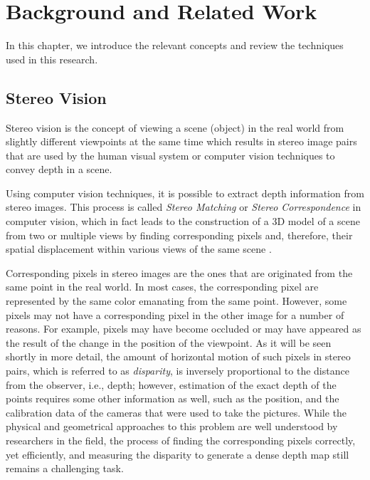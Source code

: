 \chapter{Background and Related Work}
\label{chap:Background}

In this chapter, we introduce the relevant concepts and review the techniques used in this research.

\section{Stereo Vision}

Stereo vision is the concept of viewing a scene (object) in the real world from slightly different
viewpoints at the same time which results in stereo image pairs that are used by the human visual system or computer vision techniques to convey
depth in a scene. 

Using computer vision techniques, it is possible to extract depth information from stereo
images. This process is called {\it Stereo Matching} or {\it Stereo Correspondence} in computer vision,
which in fact leads to the construction of a
3D model of a scene from two or multiple views by finding corresponding pixels and, therefore, their spatial displacement within various views of the same scene \cite{sze11}.

Corresponding pixels in stereo images are the ones that are originated from the same point in the real
world. In most cases, the corresponding pixel are represented by the same color emanating from the same point. However, some pixels may not have a corresponding 
pixel in the other image for a number of reasons. For example, pixels may have become occluded or may have appeared as the result of the change in the position
of the viewpoint. 
As it will be seen shortly in more detail, the amount of horizontal motion of such pixels
in stereo pairs, which is referred to as {\it disparity}, is inversely proportional to the
distance from the observer, i.e., depth; however,  estimation of the exact depth of the points requires some
other information as well, such as the position, and the calibration data of the cameras that were used to take the pictures.
While the physical and geometrical approaches to this problem are well understood by researchers in the field, the process of finding the corresponding pixels correctly, 
yet efficiently, and measuring the disparity to generate a dense depth map still remains a challenging task.

